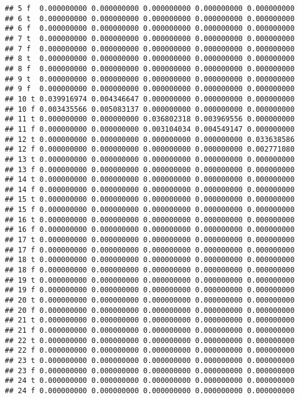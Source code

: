 \documentclass[]{article}
\begin{document}
\begin{verbatim}
## 5 f  0.000000000 0.000000000 0.000000000 0.000000000 0.000000000
## 6 t  0.000000000 0.000000000 0.000000000 0.000000000 0.000000000
## 6 f  0.000000000 0.000000000 0.000000000 0.000000000 0.000000000
## 7 t  0.000000000 0.000000000 0.000000000 0.000000000 0.000000000
## 7 f  0.000000000 0.000000000 0.000000000 0.000000000 0.000000000
## 8 t  0.000000000 0.000000000 0.000000000 0.000000000 0.000000000
## 8 f  0.000000000 0.000000000 0.000000000 0.000000000 0.000000000
## 9 t  0.000000000 0.000000000 0.000000000 0.000000000 0.000000000
## 9 f  0.000000000 0.000000000 0.000000000 0.000000000 0.000000000
## 10 t 0.039916974 0.004346647 0.000000000 0.000000000 0.000000000
## 10 f 0.003435566 0.005083137 0.000000000 0.000000000 0.000000000
## 11 t 0.000000000 0.000000000 0.036802318 0.003969556 0.000000000
## 11 f 0.000000000 0.000000000 0.003104034 0.004549147 0.000000000
## 12 t 0.000000000 0.000000000 0.000000000 0.000000000 0.033638586
## 12 f 0.000000000 0.000000000 0.000000000 0.000000000 0.002771080
## 13 t 0.000000000 0.000000000 0.000000000 0.000000000 0.000000000
## 13 f 0.000000000 0.000000000 0.000000000 0.000000000 0.000000000
## 14 t 0.000000000 0.000000000 0.000000000 0.000000000 0.000000000
## 14 f 0.000000000 0.000000000 0.000000000 0.000000000 0.000000000
## 15 t 0.000000000 0.000000000 0.000000000 0.000000000 0.000000000
## 15 f 0.000000000 0.000000000 0.000000000 0.000000000 0.000000000
## 16 t 0.000000000 0.000000000 0.000000000 0.000000000 0.000000000
## 16 f 0.000000000 0.000000000 0.000000000 0.000000000 0.000000000
## 17 t 0.000000000 0.000000000 0.000000000 0.000000000 0.000000000
## 17 f 0.000000000 0.000000000 0.000000000 0.000000000 0.000000000
## 18 t 0.000000000 0.000000000 0.000000000 0.000000000 0.000000000
## 18 f 0.000000000 0.000000000 0.000000000 0.000000000 0.000000000
## 19 t 0.000000000 0.000000000 0.000000000 0.000000000 0.000000000
## 19 f 0.000000000 0.000000000 0.000000000 0.000000000 0.000000000
## 20 t 0.000000000 0.000000000 0.000000000 0.000000000 0.000000000
## 20 f 0.000000000 0.000000000 0.000000000 0.000000000 0.000000000
## 21 t 0.000000000 0.000000000 0.000000000 0.000000000 0.000000000
## 21 f 0.000000000 0.000000000 0.000000000 0.000000000 0.000000000
## 22 t 0.000000000 0.000000000 0.000000000 0.000000000 0.000000000
## 22 f 0.000000000 0.000000000 0.000000000 0.000000000 0.000000000
## 23 t 0.000000000 0.000000000 0.000000000 0.000000000 0.000000000
## 23 f 0.000000000 0.000000000 0.000000000 0.000000000 0.000000000
## 24 t 0.000000000 0.000000000 0.000000000 0.000000000 0.000000000
## 24 f 0.000000000 0.000000000 0.000000000 0.000000000 0.000000000

\end{verbatim}
\end{document}
